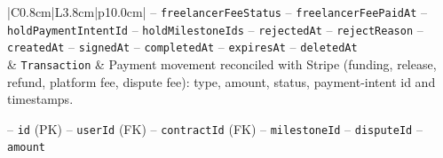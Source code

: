 \begin{center}
\begin{longtable}{|C{0.8cm}|L{3.8cm}|p{10.0cm}|}
\hspace*{1em}-- \texttt{freelancer\allowbreak Fee\allowbreak Status} \newline
\hspace*{1em}-- \texttt{freelancer\allowbreak Fee\allowbreak Paid\allowbreak At} \newline
\hspace*{1em}-- \texttt{hold\allowbreak Payment\allowbreak Intent\allowbreak Id} \newline
\hspace*{1em}-- \texttt{hold\allowbreak Milestone\allowbreak Ids} \newline
\hspace*{1em}-- \texttt{rejected\allowbreak At} \newline
\hspace*{1em}-- \texttt{reject\allowbreak Reason} \newline
\hspace*{1em}-- \texttt{created\allowbreak At} \newline
\hspace*{1em}-- \texttt{signed\allowbreak At} \newline
\hspace*{1em}-- \texttt{completed\allowbreak At} \newline
\hspace*{1em}-- \texttt{expires\allowbreak At} \newline
\hspace*{1em}-- \texttt{deleted\allowbreak At} \\
 & \texttt{Transaction} & Payment movement reconciled with Stripe (funding, release, refund, platform fee, dispute fee): type, amount, status, payment-intent id and timestamps.\par\smallskip
\hspace*{1em}-- \texttt{id} (PK) \newline
\hspace*{1em}-- \texttt{user\allowbreak Id} (FK) \newline
\hspace*{1em}-- \texttt{contract\allowbreak Id} (FK) \newline
\hspace*{1em}-- \texttt{milestone\allowbreak Id} \newline
\hspace*{1em}-- \texttt{dispute\allowbreak Id} \newline
\hspace*{1em}-- \texttt{amount} \newline

\end{longtable}
\end{center}
